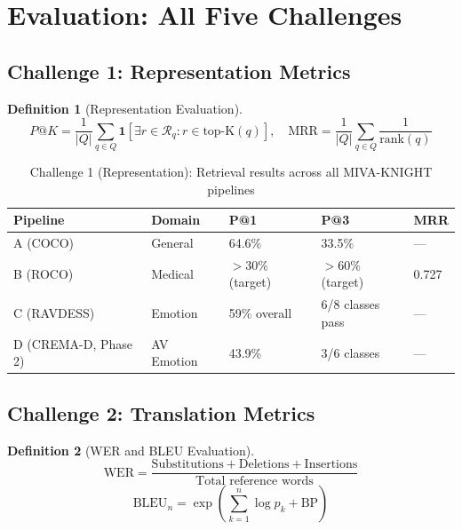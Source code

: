 \documentclass[12pt,a4paper]{article}
\theoremstyle{definition}
\newtheorem{definition}{Definition}[section]
\theoremstyle{plain}
\theoremstyle{remark}
\begin{document}
\newpage
\section{Evaluation: All Five Challenges}
\label{sec:eval}

\subsection{Challenge 1: Representation Metrics}

\begin{definition}[Representation Evaluation]
\[
  P@K = \frac{1}{|Q|}\sum_{q \in Q}\mathbf{1}[\exists r \in \mathcal{R}_q : r \in \text{top-K}(q)], \quad
  \text{MRR} = \frac{1}{|Q|}\sum_{q \in Q} \frac{1}{\text{rank}(q)}
\]
\end{definition}

\begin{table}[H]
\centering
\caption{Challenge 1 (Representation): Retrieval results across all MIVA-KNIGHT pipelines}
\begin{tabular}{lllll}
\toprule
\textbf{Pipeline} & \textbf{Domain} & \textbf{P@1} & \textbf{P@3} & \textbf{MRR} \\
\midrule
A (COCO) & General & 64.6\% & 33.5\% & — \\
B (ROCO) & Medical & $> 30\%$ (target) & $> 60\%$ (target) & 0.727 \\
C (RAVDESS) & Emotion & 59\% overall & 6/8 classes pass & — \\
D (CREMA-D, Phase 2) & AV Emotion & 43.9\% & 3/6 classes & — \\
\bottomrule
\end{tabular}
\end{table}

\subsection{Challenge 2: Translation Metrics}

\begin{definition}[WER and BLEU Evaluation]
\[
  \text{WER} = \frac{\text{Substitutions} + \text{Deletions} + \text{Insertions}}{\text{Total reference words}}
\]
\[
  \text{BLEU}_n = \exp\!\left(\sum_{k=1}^n \log p_k + \text{BP}\right)
\]
\end{definition}
\end{document}
